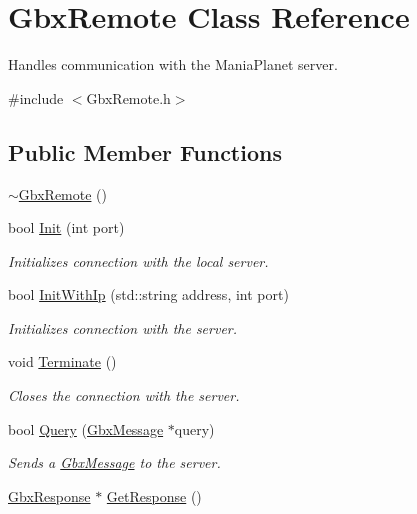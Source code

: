 \hypertarget{classGbxRemote}{\section{Gbx\-Remote Class Reference}
\label{classGbxRemote}
}


Handles communication with the Mania\-Planet server.  




{\ttfamily \#include $<$Gbx\-Remote.\-h$>$}

\subsection*{Public Member Functions}
\begin{DoxyCompactItemize}
\item 
\hyperlink{classGbxRemote_a9ac65a51eb6f9127337b4f99841cfe2d}{$\sim$\-Gbx\-Remote} ()
\item 
bool \hyperlink{classGbxRemote_a24d9d0df923ed85010f53dcb43c2b977}{Init} (int port)
\begin{DoxyCompactList}\small\item\em Initializes connection with the local server. \end{DoxyCompactList}\item 
bool \hyperlink{classGbxRemote_aa9a57e73f2f5ebbde90484503bd0d16d}{Init\-With\-Ip} (std\-::string address, int port)
\begin{DoxyCompactList}\small\item\em Initializes connection with the server. \end{DoxyCompactList}\item 
void \hyperlink{classGbxRemote_a6fa8ca2d48aae84884cab98a0adf4360}{Terminate} ()
\begin{DoxyCompactList}\small\item\em Closes the connection with the server. \end{DoxyCompactList}\item 
bool \hyperlink{classGbxRemote_abf869640136958fc4756b3a60275a285}{Query} (\hyperlink{classGbxMessage}{Gbx\-Message} $\ast$query)
\begin{DoxyCompactList}\small\item\em Sends a \hyperlink{classGbxMessage}{Gbx\-Message} to the server. \end{DoxyCompactList}\item 
\hyperlink{classGbxResponse}{Gbx\-Response} $\ast$ \hyperlink{classGbxRemote_adac67444e391ffcc1dfda8f087eaef0b}{Get\-Response} ()

\end{DoxyCompactItemize}
